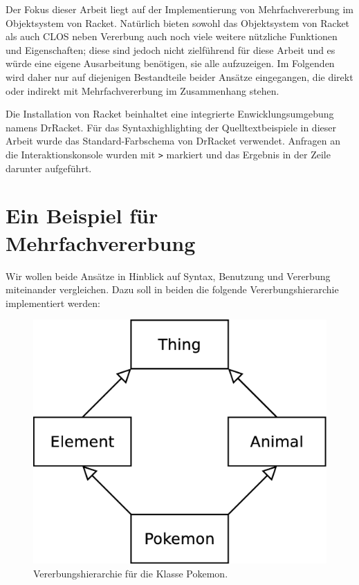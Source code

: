 Der Fokus dieser Arbeit liegt auf der Implementierung von Mehrfachvererbung im Objektsystem von Racket. Natürlich bieten sowohl das Objektsystem von Racket als auch CLOS neben Vererbung auch noch viele weitere nützliche Funktionen und Eigenschaften; diese sind jedoch nicht zielführend für diese Arbeit und es würde eine eigene Ausarbeitung benötigen, sie alle aufzuzeigen. Im Folgenden wird daher nur auf diejenigen Bestandteile beider Ansätze eingegangen, die direkt oder indirekt mit Mehrfachvererbung im Zusammenhang stehen. 

Die Installation von Racket beinhaltet eine integrierte Enwicklungsumgebung namens DrRacket. Für das Syntaxhighlighting der Quelltextbeispiele in dieser Arbeit wurde das Standard-Farbschema von DrRacket verwendet. Anfragen an die Interaktionskonsole wurden mit \texttt{>} markiert und das Ergebnis in der Zeile darunter aufgeführt. 

\section{Ein Beispiel für Mehrfachvererbung} 

Wir wollen beide Ansätze in Hinblick auf Syntax, Benutzung und Vererbung miteinander vergleichen. Dazu soll in beiden die folgende Vererbungshierarchie implementiert werden:

\begin{figure}[h]
 \centering
 \includegraphics[scale=0.3]{pictures/pokemon}
 \caption{Vererbungshierarchie für die Klasse Pokemon.}
 \label{pokemon}
\end{figure}


